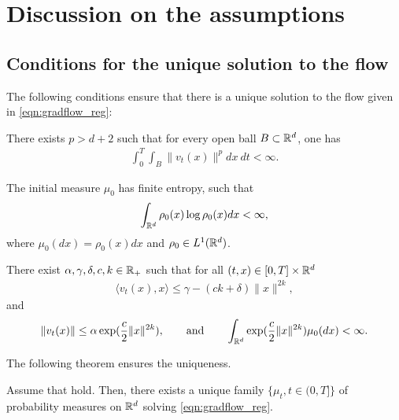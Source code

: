 \section{Discussion on the assumptions}


\subsection{Conditions for the unique solution to the flow}

The following conditions ensure that there is a unique solution to the flow given in \eqref{eqn:gradflow_reg}:
\begin{assumption}
\label{asmp:flowunq_1}
There exists $p>d+2$ such that for every open ball $B \subset \mathbb{R}^d$, one has
\begin{align}
\int_0^T \int_B \|v_t(x)\|^p dx\> dt < \infty.
\end{align}
\end{assumption}
%
\begin{assumption}
\label{asmp:flowunq_2}
The initial measure $\mu_0$ has finite entropy, such that
\begin{align}
\int_{\mathbb{R}^d} \rho_0(x) \log \rho_0(x) dx < \infty,
\end{align}
where $\mu_0(dx) = \rho_0(x)dx$ and $\rho_0 \in L^1(\mathbb{R}^d)$.
\end{assumption}
%
\begin{assumption}
\label{asmp:flowunq_3}
There exist $\alpha, \gamma, \delta, c, k \in \mathbb{R}_+$ such that for all $(t,x) \in [0,T] \times \mathbb{R}^d$ 
\begin{align}
\langle v_t(x), x \rangle \leq \gamma - (ck + \delta) \| x\|^{2k},
\end{align}
and 
\begin{align}
\label{asmp:flowunq_4}
\|v_t(x)\| \leq \alpha \exp(\frac{c}{2} \|x\|^{2k}), \qquad \text{and} \qquad \int_{\mathbb{R}^d} \exp(\frac{c}{2}\|x\|^{2k} ) \mu_0(dx) < \infty.
\end{align}
\end{assumption}

The following theorem ensures the uniqueness.
\begin{thm}
Assume that  hold. Then, there exists a unique family $\{\mu_t, t\in(0,T]\}$ of probability measures on $\mathbb{R}^d$ solving \eqref{eqn:gradflow_reg}.
\end{thm}

